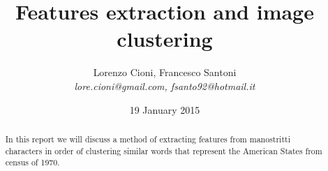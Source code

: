 \documentclass[a4paper,12pt]{article}
\title{\bf Features extraction and image clustering}
\date {19 January 2015}
\author{Lorenzo Cioni, Francesco Santoni\\\textit{{\small lore.cioni@gmail.com, fsanto92@hotmail.it}}}
\begin{document}
\maketitle

\begin{abstract}
In this report we will discuss a method of extracting features from manostritti characters in order of clustering similar words that represent the American States from census of 1970.
\end{abstract}

\tableofcontents









\end{document}
